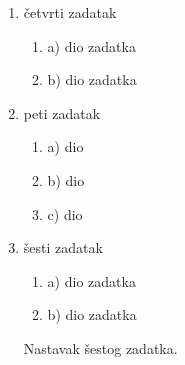 \documentclass[a4paper,11pt]{article}
\begin{document}
\vspace*{0.5cm}

\noindent{}

\begin{enumerate}
\setcounter{enumi}{\value{grupe}}

\item \v{c}etvrti zadatak
\begin{enumerate}
\item a) dio zadatka
\item b) dio zadatka
\end{enumerate}


\newpage %

\item peti zadatak
\begin{enumerate}
\item a) dio
\item b) dio
\item c) dio
\end{enumerate}


\item \v{s}esti zadatak
\begin{enumerate}
\item a) dio zadatka
\item b) dio zadatka
\end{enumerate}
Nastavak \v{s}estog zadatka.

\end{enumerate}
\end{document}
